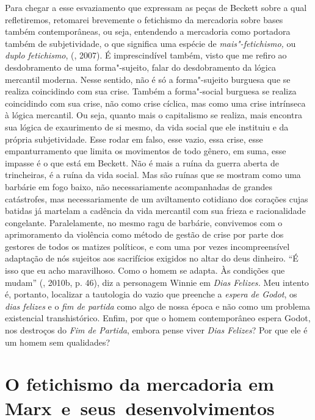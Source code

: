 {Para chegar a esse esvaziamento que expressam as peças de Beckett sobre
a qual refletiremos, retomarei brevemente o fetichismo da mercadoria sobre bases
também contemporâneas, ou seja, entendendo a mercadoria como portadora
também de subjetividade, o que significa uma espécie de
\emph{mais"-fetichismo,} ou \emph{duplo fetichismo}, (,
2007). É imprescindível também, visto que me refiro ao
desdobramento de uma forma"-sujeito, falar do desdobramento da lógica
mercantil moderna. Nesse sentido, não é só a forma"-sujeito burguesa que
se realiza coincidindo com sua crise. Também a forma"-social burguesa se
realiza coincidindo com sua crise, não como crise cíclica, mas como uma
crise intrínseca à lógica mercantil. Ou seja, quanto mais o capitalismo
se realiza, mais encontra sua lógica de exaurimento de si mesmo, da vida
social que ele instituiu e da própria subjetividade. Esse rodar em
falso, esse vazio, essa crise, esse empanturramento que limita os
movimentos de todo gênero, em suma, esse impasse é o que está em
Beckett. Não é mais a ruína da guerra aberta de trincheiras, é a ruína da vida social.
Mas são ruínas que se mostram como uma barbárie em fogo baixo, não
necessariamente acompanhadas de grandes catástrofes, mas necessariamente
de um aviltamento cotidiano dos corações cujas batidas já martelam a
cadência da vida mercantil com sua frieza e racionalidade congelante.
Paralelamente, no mesmo ragu de barbárie, convivemos com o
aprimoramento da violência como método de gestão de crise por parte
dos gestores de todos os matizes políticos, e com uma por vezes
incompreensível adaptação de nós sujeitos aos sacrifícios exigidos no
altar do deus dinheiro. ``É isso que eu acho maravilhoso.
Como o homem se adapta. Às condições que mudam'' (, 2010b, p.
46), diz a personagem Winnie em \emph{Dias Felizes.} Meu intento é,
portanto, localizar a tautologia do vazio que preenche a \emph{espera de
Godot}, os \emph{dias felizes} e o \emph{fim de partida} como algo de
nossa época e não como um problema existencial transhistórico. Enfim,
por que o homem contemporâneo espera Godot, nos destroços do \emph{Fim
de Partida}, embora pense viver \emph{Dias Felizes}? Por que ele é um
homem sem qualidades?

\section*{O fetichismo da mercadoria em Marx~e~seus~desenvolvimentos}

}
